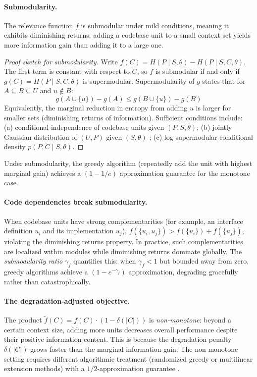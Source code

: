 \documentclass[11pt, a4paper, logo, copyright]{googledeepmind}
\begin{document}
\paragraph{Submodularity.} The relevance function $f$ is submodular under mild conditions, meaning it exhibits diminishing returns: adding a codebase unit to a small context set yields more information gain than adding it to a large one.

\begin{proof}[Proof sketch for submodularity]
Write $f(C) = H(P \mid S, \theta) - H(P \mid S, C, \theta)$. The first term is constant with respect to $C$, so $f$ is submodular if and only if $g(C) = H(P \mid S, C, \theta)$ is supermodular. Supermodularity of $g$ states that for $A \subseteq B \subseteq U$ and $u \notin B$:
\[
    g(A \cup \{u\}) - g(A) \leq g(B \cup \{u\}) - g(B)
\]
Equivalently, the marginal reduction in entropy from adding $u$ is larger for smaller sets (diminishing returns of information). Sufficient conditions include: (a) conditional independence of codebase units given $(P, S, \theta)$; (b) jointly Gaussian distribution of $(U, P)$ given $(S, \theta)$ \citep{krause2008near}; (c) log-supermodular conditional density $p(P, C \mid S, \theta)$.
\end{proof}

Under submodularity, the greedy algorithm (repeatedly add the unit with highest marginal gain) achieves a $(1-1/e)$ approximation guarantee for the monotone case.

\paragraph{Code dependencies break submodularity.} When codebase units have strong complementarities (for example, an interface definition $u_i$ and its implementation $u_j$), $f(\{u_i, u_j\}) > f(\{u_i\}) + f(\{u_j\})$, violating the diminishing returns property. In practice, such complementarities are localized within modules while diminishing returns dominate globally. The \emph{submodularity ratio} $\gamma_f$ \citep{das2011submodular} quantifies this: when $\gamma_f < 1$ but bounded away from zero, greedy algorithms achieve a $(1 - e^{-\gamma_f})$ approximation, degrading gracefully rather than catastrophically.

\paragraph{The degradation-adjusted objective.} The product $\tilde{f}(C) = f(C) \cdot (1 - \delta(|C|))$ is \emph{non-monotone}: beyond a certain context size, adding more units decreases overall performance despite their positive information content. This is because the degradation penalty $\delta(|C|)$ grows faster than the marginal information gain. The non-monotone setting requires different algorithmic treatment (randomized greedy or multilinear extension methods) with a $1/2$-approximation guarantee \citep{buchbinder2015tight}.
\end{document}
